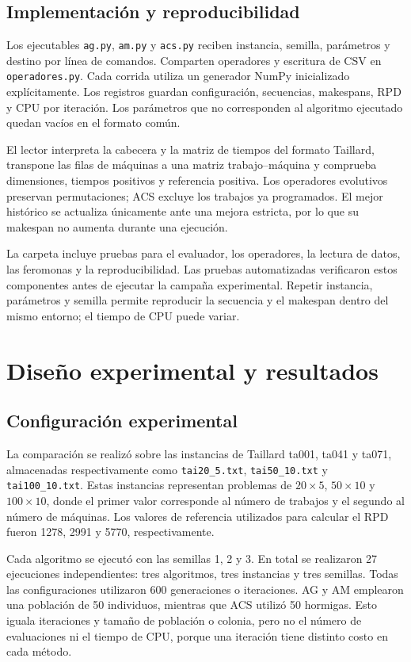 \documentclass[journal]{IEEEtran}
\begin{document}
\subsection{Implementación y reproducibilidad}
Los ejecutables \texttt{ag.py}, \texttt{am.py} y \texttt{acs.py} reciben instancia, semilla, parámetros y destino por línea de comandos. Comparten operadores y escritura de CSV en \texttt{operadores.py}. Cada corrida utiliza un generador NumPy inicializado explícitamente. Los registros guardan configuración, secuencias, makespans, RPD y CPU por iteración. Los parámetros que no corresponden al algoritmo ejecutado quedan vacíos en el formato común.

El lector interpreta la cabecera y la matriz de tiempos del formato Taillard, transpone las filas de máquinas a una matriz trabajo--máquina y comprueba dimensiones, tiempos positivos y referencia positiva. Los operadores evolutivos preservan permutaciones; ACS excluye los trabajos ya programados. El mejor histórico se actualiza únicamente ante una mejora estricta, por lo que su makespan no aumenta durante una ejecución.

La carpeta incluye pruebas para el evaluador, los operadores, la lectura de datos, las feromonas y la reproducibilidad. Las pruebas automatizadas verificaron estos componentes antes de ejecutar la campaña experimental. Repetir instancia, parámetros y semilla permite reproducir la secuencia y el makespan dentro del mismo entorno; el tiempo de CPU puede variar.

\section{Diseño experimental y resultados}
\label{sec:resultados}

\subsection{Configuración experimental}

La comparación se realizó sobre las instancias de Taillard ta001, ta041 y ta071, almacenadas respectivamente como \texttt{tai20\_5.txt}, \texttt{tai50\_10.txt} y \texttt{tai100\_10.txt}. Estas instancias representan problemas de $20\times5$, $50\times10$ y $100\times10$, donde el primer valor corresponde al número de trabajos y el segundo al número de máquinas. Los valores de referencia utilizados para calcular el RPD fueron 1278, 2991 y 5770, respectivamente.

Cada algoritmo se ejecutó con las semillas 1, 2 y 3. En total se realizaron 27 ejecuciones independientes: tres algoritmos, tres instancias y tres semillas. Todas las configuraciones utilizaron 600 generaciones o iteraciones. AG y AM emplearon una población de 50 individuos, mientras que ACS utilizó 50 hormigas. Esto iguala iteraciones y tamaño de población o colonia, pero no el número de evaluaciones ni el tiempo de CPU, porque una iteración tiene distinto costo en cada método.
\end{document}

